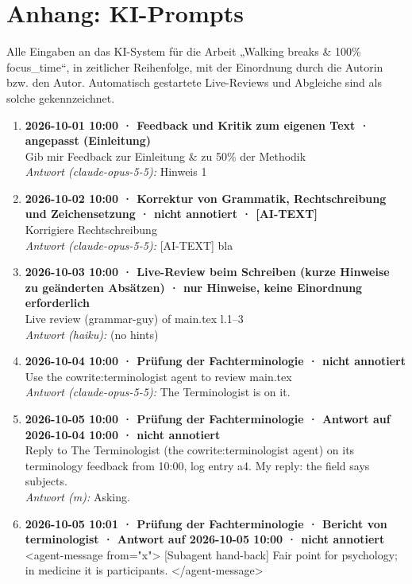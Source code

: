 \section*{Anhang: KI-Prompts}

Alle Eingaben an das KI-System für die Arbeit „Walking breaks \& 100\% focus\_time“, in zeitlicher Reihenfolge, mit der Einordnung durch die Autorin bzw. den Autor. Automatisch gestartete Live-Reviews und Abgleiche sind als solche gekennzeichnet.

\begin{enumerate}
  \item \textbf{2026-10-01 10:00 · Feedback und Kritik zum eigenen Text · angepasst (Einleitung)} \\
  Gib mir Feedback zur Einleitung \& zu 50\% der Methodik
  \\ \textit{Antwort (claude-opus-5-5):} Hinweis 1
  \item \textbf{2026-10-02 10:00 · Korrektur von Grammatik, Rechtschreibung und Zeichensetzung · nicht annotiert · [AI-TEXT]} \\
  Korrigiere Rechtschreibung
  \\ \textit{Antwort (claude-opus-5-5):} [AI-TEXT] bla
  \item \textbf{2026-10-03 10:00 · Live-Review beim Schreiben (kurze Hinweise zu geänderten Absätzen) · nur Hinweise, keine Einordnung erforderlich} \\
  Live review (grammar-guy) of main.tex l.1–3
  \\ \textit{Antwort (haiku):} (no hints)
  \item \textbf{2026-10-04 10:00 · Prüfung der Fachterminologie · nicht annotiert} \\
  Use the cowrite:terminologist agent to review main.tex
  \\ \textit{Antwort (claude-opus-5-5):} The Terminologist is on it.
  \item \textbf{2026-10-05 10:00 · Prüfung der Fachterminologie · Antwort auf 2026-10-04 10:00 · nicht annotiert} \\
  Reply to The Terminologist (the cowrite:terminologist agent) on its terminology feedback from 10:00, log entry a4. My reply: the field says subjects.
  \\ \textit{Antwort (m):} Asking.
  \item \textbf{2026-10-05 10:01 · Prüfung der Fachterminologie · Bericht von terminologist · Antwort auf 2026-10-05 10:00 · nicht annotiert} \\
  <agent-message from="x"> [Subagent hand-back] Fair point for psychology; in medicine it is participants. </agent-message>

\end{enumerate}
